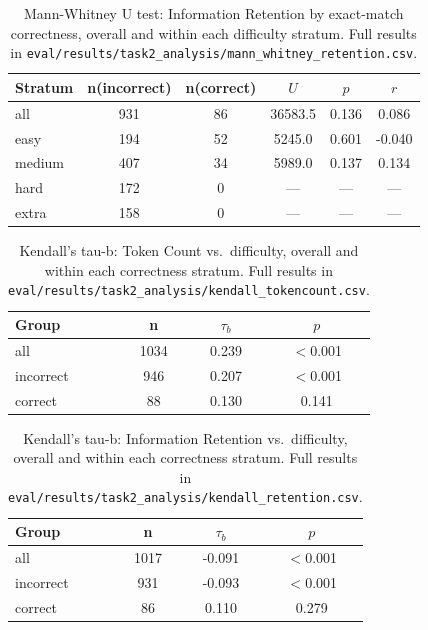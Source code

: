 \begin{table}[H]
\centering
\footnotesize
\caption{Mann-Whitney U test: Information Retention by exact-match correctness, overall and within each difficulty stratum. Full results in \texttt{eval/results/task2\_analysis/mann\_whitney\_retention.csv}.}
\label{tab:rq2-mw-retention}
\begin{tabular}{lccccc}
\toprule
Stratum & n(incorrect) & n(correct) & $U$ & $p$ & $r$ \\
\midrule
all & 931 & 86 & 36583.5 & 0.136 & 0.086 \\
easy & 194 & 52 & 5245.0 & 0.601 & -0.040 \\
medium & 407 & 34 & 5989.0 & 0.137 & 0.134 \\
hard & 172 & 0 & --- & --- & --- \\
extra & 158 & 0 & --- & --- & --- \\
\bottomrule
\end{tabular}
\end{table}

\begin{table}[H]
\centering
\footnotesize
\caption{Kendall's tau-b: Token Count vs.\ difficulty, overall and within each correctness stratum. Full results in \texttt{eval/results/task2\_analysis/kendall\_tokencount.csv}.}
\label{tab:rq2-kendall-tokencount}
\begin{tabular}{lccc}
\toprule
Group & n & $\tau_b$ & $p$ \\
\midrule
all & 1034 & 0.239 & $<$0.001 \\
incorrect & 946 & 0.207 & $<$0.001 \\
correct & 88 & 0.130 & 0.141 \\
\bottomrule
\end{tabular}
\end{table}

\begin{table}[H]
\centering
\footnotesize
\caption{Kendall's tau-b: Information Retention vs.\ difficulty, overall and within each correctness stratum. Full results in \texttt{eval/results/task2\_analysis/kendall\_retention.csv}.}
\label{tab:rq2-kendall-retention}
\begin{tabular}{lccc}
\toprule
Group & n & $\tau_b$ & $p$ \\
\midrule
all & 1017 & -0.091 & $<$0.001 \\
incorrect & 931 & -0.093 & $<$0.001 \\
correct & 86 & 0.110 & 0.279 \\
\bottomrule
\end{tabular}
\end{table}

